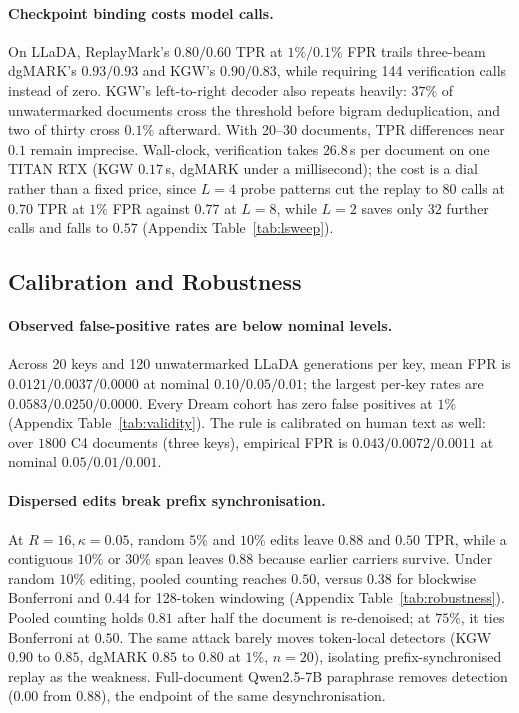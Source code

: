 \paragraph{Checkpoint binding costs model calls.}
On LLaDA, ReplayMark's $0.80/0.60$ TPR at $1\%/0.1\%$ FPR trails three-beam dgMARK's
$0.93/0.93$ and KGW's $0.90/0.83$, while requiring 144 verification calls instead of zero.
KGW's left-to-right decoder also repeats heavily: $37\%$ of unwatermarked documents cross the
threshold before bigram deduplication, and two of thirty cross $0.1\%$ afterward. With 20--30
documents, TPR differences near $0.1$ remain imprecise. Wall-clock, verification takes
$26.8$\,s per document on one TITAN RTX (KGW $0.17$\,s, dgMARK under a millisecond); the
cost is a dial rather than a fixed price, since $L=4$ probe patterns cut the replay to $80$
calls at $0.70$ TPR at $1\%$ FPR against $0.77$ at $L=8$, while $L=2$ saves only $32$
further calls and falls to $0.57$ (Appendix Table~\ref{tab:lsweep}).

\subsection{Calibration and Robustness}
\label{sec:calibration}

\paragraph{Observed false-positive rates are below nominal levels.}
Across 20 keys and 120 unwatermarked LLaDA generations per key, mean FPR is
$0.0121/0.0037/0.0000$ at nominal $0.10/0.05/0.01$; the largest per-key rates are
$0.0583/0.0250/0.0000$. Every Dream cohort has zero false positives at $1\%$
(Appendix Table~\ref{tab:validity}). The rule is calibrated on human text as well: over
$1800$ C4 documents (three keys), empirical FPR is $0.043/0.0072/0.0011$ at nominal
$0.05/0.01/0.001$.

\paragraph{Dispersed edits break prefix synchronisation.}
At $R=16,\kappa=0.05$, random $5\%$ and $10\%$ edits leave $0.88$ and $0.50$ TPR, while a
contiguous $10\%$ or $30\%$ span leaves $0.88$ because earlier carriers survive. Under random
$10\%$ editing, pooled counting reaches $0.50$, versus $0.38$ for blockwise Bonferroni and
$0.44$ for 128-token windowing (Appendix Table~\ref{tab:robustness}). Pooled counting holds
$0.81$ after half the document is re-denoised; at $75\%$, it ties Bonferroni at $0.50$. The same
attack barely moves token-local detectors (KGW $0.90$ to $0.85$, dgMARK $0.85$ to $0.80$ at
$1\%$, $n{=}20$), isolating prefix-synchronised replay as the weakness. Full-document Qwen2.5-7B
paraphrase removes detection ($0.00$ from $0.88$), the endpoint of the same desynchronisation.
